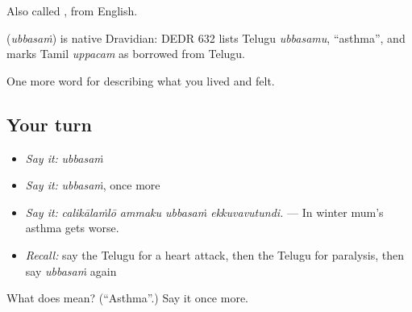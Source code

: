 Also called , from English.

\begin{cousinweb}
\textbf{} (\emph{ubbasaṁ}) is native Dravidian: DEDR 632 lists Telugu \emph{ubbasamu}, \textquotedblleft{}asthma\textquotedblright{}, and marks Tamil \emph{uppacam} as borrowed from Telugu.
\end{cousinweb}

\begin{grammarlens}[title={What you've built}]
One more word for describing what you lived and felt.
\end{grammarlens}

\subsection*{Your turn}
\begin{itemize}
\raggedright
  \item \emph{Say it:} \emph{ubbasaṁ}
  \item \emph{Say it:} \emph{ubbasaṁ}, once more
  \item \emph{Say it:} \emph{calikālaṁlō ammaku ubbasaṁ ekkuvavutundi.} — In winter mum's asthma gets worse.
  \item \emph{Recall:} say the Telugu for a heart attack, then the Telugu for paralysis, then say \emph{ubbasaṁ} again
\end{itemize}

\begin{tcolorbox}[breakable,colback=teal!4,colframe=teal!35!black,title={Before you move on}]
What does  mean? (\textquotedblleft{}Asthma\textquotedblright{}.) Say it once more.
\end{tcolorbox}
